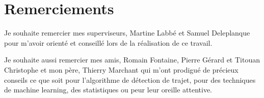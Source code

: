 \documentclass[letterpaper]{article}
\begin{document}
\section{Remerciements}

Je souhaite remercier mes superviseurs, Martine Labbé et Samuel Deleplanque pour m'avoir orienté et conseillé lors de la réalisation de ce travail.

Je souhaite aussi remercier mes amis, Romain Fontaine, Pierre Gérard et Titouan Christophe et mon père, Thierry Marchant qui m'ont prodigué de précieux conseils ce que soit pour l'algorithme de détection de trajet, pour des techniques de machine learning, des statistiques ou peur leur oreille attentive.

\footnotesize


\end{document}
